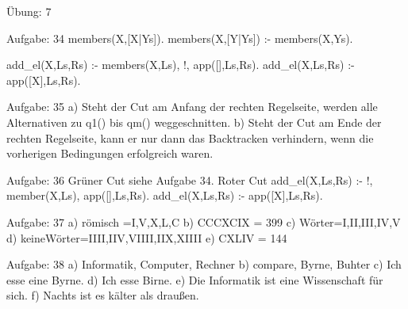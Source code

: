 Übung: 7

Aufgabe: 34
members(X,[X|Ys]).
members(X,[Y|Ys]) :- members(X,Ys).

add_el(X,Ls,Rs) :- members(X,Ls), !, app([],Ls,Rs).
add_el(X,Ls,Rs) :- app([X],Ls,Rs).


Aufgabe: 35
a) Steht der Cut am Anfang der rechten Regelseite, werden alle Alternativen zu q1() bis qm() 
	weggeschnitten.
b) Steht der Cut am Ende der rechten Regelseite, kann er nur dann das Backtracken verhindern, 
	wenn die vorherigen Bedingungen erfolgreich waren.

	
Aufgabe: 36
Grüner Cut siehe Aufgabe 34.
Roter Cut add_el(X,Ls,Rs) :- !, member(X,Ls), app([],Ls,Rs).
		  add_el(X,Ls,Rs) :- app([X],Ls,Rs).

		  
Aufgabe: 37
a) \sum römisch ={I,V,X,L,C}
b) CCCXCIX = 399
c) Wörter={I,II,III,IV,V}
d) keineWörter={IIII,IIV,VIIII,IIX,XIIII}
e) CXLIV = 144


Aufgabe: 38
a) Informatik, Computer, Rechner
b) compare, Byrne, Buhter
c) Ich esse eine Byrne.
d) Ich esse Birne.
e) Die Informatik ist eine Wissenschaft für sich.
f) Nachts ist es kälter als draußen.